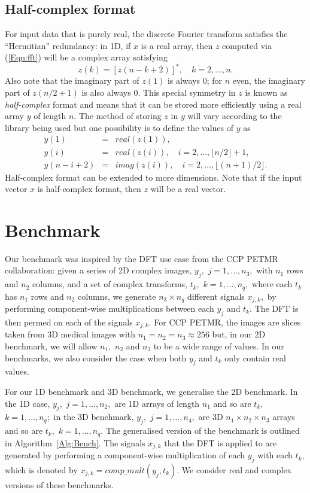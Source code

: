 \documentclass[a4paper]{article}
\begin{document}
\subsection{Half-complex format}
For input data that is purely real, the discrete Fourier transform satisfies 
the ``Hermitian'' redundancy: in 1D, if $x$ is a real array, then $z$ computed 
via (\ref{Eqn:fft}) will be a complex array satisfying
$$z(k) = \left[z(n-k+2)\right]^*, \quad k=2,\ldots,n.$$ Also note that the 
imaginary part of $z(1)$ is always 0; for $n$ even, the imaginary part of 
$z(n/2 + 1) $ is also always 0. This special symmetry in $z$ is known as 
\textit{half-complex} format and means that it can 
be stored more efficiently using a real array $y$ of length $n.$ The method of 
storing $z$ in $y$ will vary according to the library being used but one 
possibility is to define the values of $y$ as
\begin{eqnarray*}
y(1) & = & real(z(1)),\\
y(i) & = & real(z(i)), \quad i=2,\ldots,\lfloor n/2 \rfloor +1,\\
y(n-i+2) & = & imag(z(i)), \quad i=2,\ldots, \lfloor (n+1)/2  \rfloor.
\end{eqnarray*} 
Half-complex format can 
be extended to more dimensions. Note that if the input vector $x$ is 
half-complex format, then $z$ will be a real vector.

\section{Benchmark}\label{Sec:Benchmark}
Our benchmark was inspired by the DFT use case from the CCP PETMR
collaboration: given a series of 2D complex images, $y_j,$
$j=1,\ldots,n_3,$ with $n_1$ rows and $n_2$ columns, and a set of
complex transforms, $t_k,$ $k=1,\ldots,n_q,$ where each $t_k$
has $n_1$ rows and $n_2$ columns, we generate $n_3\times n_q$
different signals $x_{j,k},$ by performing component-wise
multiplications between each $y_j$ and $t_k.$ The DFT is then permed
on each of the signals $x_{j,k}.$ For CCP PETMR, the images are slices
taken from 3D medical images with $n_1=n_2=n_3\approx 256$ but, in our
2D benchmark, we will allow $n_1,$ $n_2$ and $n_3$ to be a wide range
of values. In our benchmarks, we also consider the case when both
$y_j$ and $t_k$ only contain real values.

For our 1D benchmark and 3D benchmark, we generalise the 2D benchmark.
In the 1D case, $y_j,$ $j=1,\ldots,n_2,$ are 1D arrays of length $n_1$
and so are $t_k,$ $k=1,\ldots,n_q;$ in the 3D benchmark, $y_j,$
$j=1,\ldots,n_4,$ are 3D $n_1\times n_2\times n_3$ arrays and so are
$t_k,$ $k=1,\ldots,n_q.$ The generalised version of the benchmark is
outlined in Algorithm~\ref{Alg:Bench}. The signals $x_{j,k}$ that the
DFT is applied to are generated by performing a component-wise
multiplication of each $y_j$ with each $t_k,$ which is denoted by
$x_{j,k} = comp\_mult(y_j,t_k).$ We consider real and complex versions
of these benchmarks.
\end{document}

